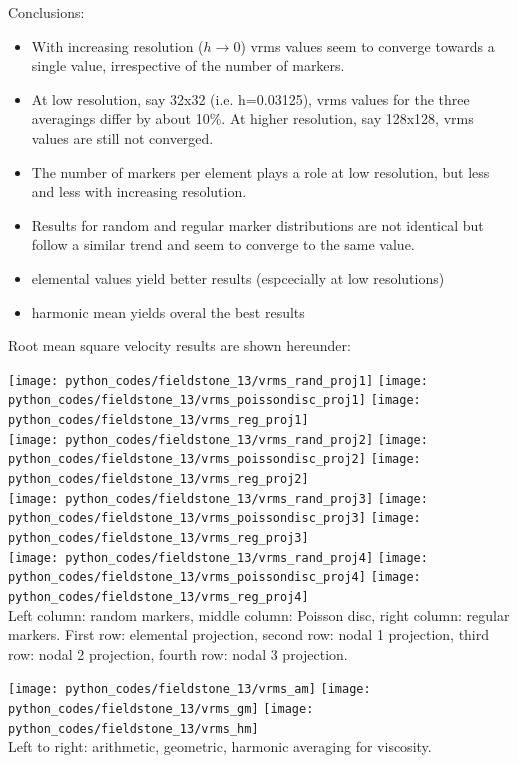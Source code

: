 Conclusions:
\begin{itemize}
\item
With increasing resolution ($h\rightarrow 0$) vrms values seem to converge towards a single value, irrespective 
of the number of markers. 

\item
At low resolution, say 32x32 (i.e. h=0.03125), vrms values for the three averagings differ by about 10\%. At higher resolution, say 128x128, vrms values are still not converged.  

\item
The number of markers per element plays a role at low resolution, but less and less with increasing resolution. 

\item
Results for random and regular marker distributions are not identical but follow a similar trend and seem to converge to 
the same value.

\item  elemental values yield better results (espcecially at low resolutions)

\item harmonic mean yields overal the best results
\end{itemize}

\newpage
Root mean square velocity results are shown hereunder:
\begin{center}
\texttt{[image: python\_codes/fieldstone\_13/vrms\_rand\_proj1]} 
\texttt{[image: python\_codes/fieldstone\_13/vrms\_poissondisc\_proj1]} 
\texttt{[image: python\_codes/fieldstone\_13/vrms\_reg\_proj1]}\\ 
\texttt{[image: python\_codes/fieldstone\_13/vrms\_rand\_proj2]} 
\texttt{[image: python\_codes/fieldstone\_13/vrms\_poissondisc\_proj2]} 
\texttt{[image: python\_codes/fieldstone\_13/vrms\_reg\_proj2]}\\ 
\texttt{[image: python\_codes/fieldstone\_13/vrms\_rand\_proj3]} 
\texttt{[image: python\_codes/fieldstone\_13/vrms\_poissondisc\_proj3]} 
\texttt{[image: python\_codes/fieldstone\_13/vrms\_reg\_proj3]}\\
\texttt{[image: python\_codes/fieldstone\_13/vrms\_rand\_proj4]} 
\texttt{[image: python\_codes/fieldstone\_13/vrms\_poissondisc\_proj4]} 
\texttt{[image: python\_codes/fieldstone\_13/vrms\_reg\_proj4]}\\
{\small Left column: random markers, middle column: Poisson disc, right column: regular markers.
First row: elemental projection, second row: nodal 1 projection, 
third row: nodal 2 projection, fourth row: nodal 3 projection. }
\end{center}

\begin{center}
\texttt{[image: python\_codes/fieldstone\_13/vrms\_am]} 
\texttt{[image: python\_codes/fieldstone\_13/vrms\_gm]} 
\texttt{[image: python\_codes/fieldstone\_13/vrms\_hm]}\\
{\small Left to right: arithmetic, geometric, harmonic averaging for viscosity.}
\end{center}
